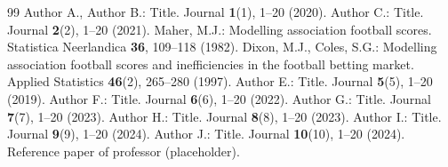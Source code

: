 \documentclass[pdflatex,sn-mathphys-num]{sn-jnl}
\theoremstyle{thmstyleone}
\theoremstyle{thmstyletwo}
\theoremstyle{thmstylethree}
\begin{document}
\begin{thebibliography}{99}
 Author A., Author B.: Title. Journal \textbf{1}(1), 1--20 (2020).
 Author C.: Title. Journal \textbf{2}(2), 1--20 (2021).
 Maher, M.J.: Modelling association football scores. Statistica Neerlandica \textbf{36}, 109--118 (1982).
 Dixon, M.J., Coles, S.G.: Modelling association football scores and inefficiencies in the football betting market. Applied Statistics \textbf{46}(2), 265--280 (1997).
 Author E.: Title. Journal \textbf{5}(5), 1--20 (2019).
 Author F.: Title. Journal \textbf{6}(6), 1--20 (2022).
 Author G.: Title. Journal \textbf{7}(7), 1--20 (2023).
 Author H.: Title. Journal \textbf{8}(8), 1--20 (2023).
 Author I.: Title. Journal \textbf{9}(9), 1--20 (2024).
 Author J.: Title. Journal \textbf{10}(10), 1--20 (2024).
 Reference paper of professor (placeholder).

\end{thebibliography}
\end{document}
